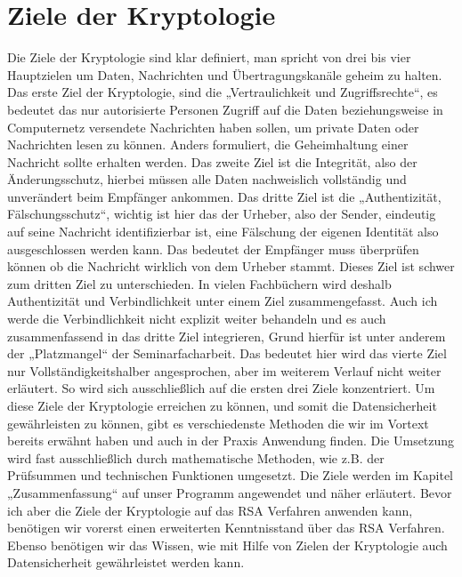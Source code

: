 \chapter{Ziele der Kryptologie}
Die Ziele der Kryptologie sind klar definiert, man spricht von drei bis vier Hauptzielen um Daten, Nachrichten und Übertragungskanäle geheim zu halten. Das erste Ziel der Kryptologie, sind die „Vertraulichkeit und Zugriffsrechte“, es bedeutet das nur autorisierte Personen Zugriff auf die Daten beziehungsweise in Computernetz versendete Nachrichten haben sollen, um private Daten oder Nachrichten lesen zu können. Anders formuliert, die Geheimhaltung einer Nachricht sollte erhalten werden. Das zweite Ziel ist die Integrität, also der Änderungsschutz, hierbei müssen alle Daten nachweislich vollständig und unverändert beim Empfänger ankommen. Das dritte Ziel ist die „Authentizität, Fälschungsschutz“, wichtig ist hier das der Urheber, also der Sender, eindeutig auf seine Nachricht identifizierbar ist, eine Fälschung der eigenen Identität also ausgeschlossen werden kann. Das bedeutet der Empfänger muss überprüfen können ob die Nachricht wirklich von dem Urheber stammt. Dieses Ziel ist schwer zum dritten Ziel zu unterschieden. In vielen Fachbüchern wird deshalb Authentizität und Verbindlichkeit unter einem Ziel zusammengefasst. Auch ich werde die Verbindlichkeit nicht explizit weiter behandeln und es auch zusammenfassend in das dritte Ziel integrieren, Grund hierfür ist unter anderem der „Platzmangel“ der Seminarfacharbeit. Das bedeutet hier wird das vierte Ziel nur Vollständigkeitshalber angesprochen, aber im weiterem Verlauf nicht weiter erläutert. So wird sich ausschließlich auf die ersten drei Ziele konzentriert. Um diese Ziele der Kryptologie erreichen zu können, und somit die Datensicherheit gewährleisten zu können, gibt es verschiedenste Methoden die wir im Vortext bereits erwähnt haben und auch in der Praxis Anwendung finden. Die Umsetzung wird fast ausschließlich durch mathematische Methoden, wie z.B. der Prüfsummen und technischen Funktionen umgesetzt. Die Ziele werden im Kapitel „Zusammenfassung“ auf unser Programm angewendet und näher erläutert. Bevor ich aber die Ziele der Kryptologie auf das RSA Verfahren anwenden kann, benötigen wir vorerst einen erweiterten Kenntnisstand über das RSA Verfahren. Ebenso benötigen wir das Wissen, wie mit Hilfe von Zielen der Kryptologie auch Datensicherheit gewährleistet werden kann. 

